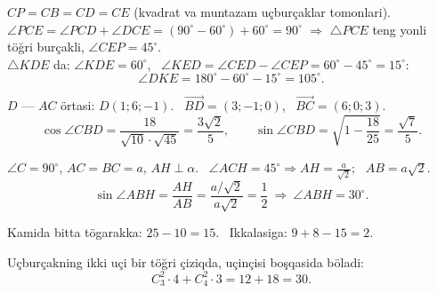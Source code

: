 $CP=CB=CD=CE$ (kvadrat va muntazam uçburçaklar tomonlari).\\
$\angle PCE=\angle PCD+\angle DCE=(90^\circ-60^\circ)+60^\circ=90^\circ$ $\Rightarrow$ $\triangle PCE$ teng yonli töğri burçakli, $\angle CEP=45^\circ$.\\
$\triangle KDE$ da: $\angle KDE=60^\circ$, \ $\angle KED=\angle CED-\angle CEP=60^\circ-45^\circ=15^\circ$:
\[\angle DKE=180^\circ-60^\circ-15^\circ=105^\circ.\]

$D$ — $AC$ örtasi: $D(1;6;-1)$. \ $\overrightarrow{BD}=(3;-1;0)$, \ $\overrightarrow{BC}=(6;0;3)$.
\[\cos\angle CBD=\frac{18}{\sqrt{10}\cdot\sqrt{45}}=\frac{3\sqrt2}5,\qquad \sin\angle CBD=\sqrt{1-\frac{18}{25}}=\frac{\sqrt7}5.\]

$\angle C=90^\circ$, $AC=BC=a$, $AH\perp\alpha$. \ $\angle ACH=45^\circ\Rightarrow AH=\frac a{\sqrt2}$; \ $AB=a\sqrt2$.
\[\sin\angle ABH=\frac{AH}{AB}=\frac{a/\sqrt2}{a\sqrt2}=\frac12\ \Rightarrow\ \angle ABH=30^\circ.\]

Kamida bitta tögarakka: $25-10=15$. \ Ikkalasiga: $9+8-15=2$.

Uçburçakning ikki uçi bir töğri çiziqda, uçinçisi boşqasida böladi:
\[C_3^2\cdot4+C_4^2\cdot3=12+18=30.\]

